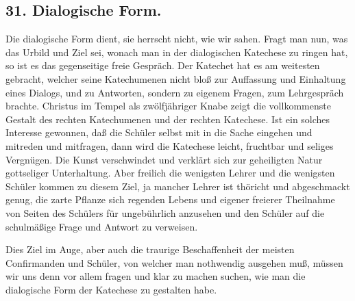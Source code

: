 \subsection*{31. Dialogische Form.}

Die dialogische Form dient, sie herrscht nicht, wie wir sahen. Fragt man nun, was das Urbild und Ziel sei, wonach man in der dialogischen Katechese zu ringen hat, so ist es das gegenseitige freie Gespräch. Der Katechet hat es am weitesten gebracht, welcher seine Katechumenen nicht bloß zur Auffassung und Einhaltung eines Dialogs, und zu Antworten, sondern zu eigenem Fragen, zum Lehrgespräch brachte. Christus im Tempel als zwölfjähriger Knabe zeigt die vollkommenste Gestalt des rechten Katechumenen und der rechten Katechese. Ist ein solches Interesse gewonnen, daß die Schüler selbst mit in die Sache eingehen und mitreden und mitfragen, dann wird die Katechese leicht, fruchtbar und seliges Vergnügen. Die Kunst verschwindet und verklärt sich zur geheiligten Natur gottseliger Unterhaltung. Aber freilich die wenigsten Lehrer und die wenigsten Schüler kommen zu diesem Ziel, ja mancher Lehrer ist thöricht und abgeschmackt genug, die zarte Pflanze
sich regenden Lebens und eigener freierer Theilnahme von Seiten des Schülers für ungebührlich anzusehen und den Schüler auf die schulmäßige Frage und Antwort zu verweisen.

Dies Ziel im Auge, aber auch die traurige Beschaffenheit der meisten Confirmanden und Schüler, von welcher man nothwendig ausgehen muß, müssen wir uns denn vor allem fragen und klar zu machen suchen, wie man die dialogische Form der Katechese zu gestalten habe.

